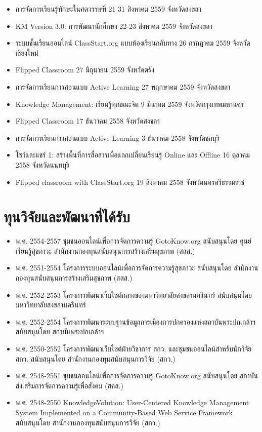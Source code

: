 \begin{tcolorbox}[breakable,enhanced,fonttitle=\bfseries]
\begin{itemize}
	\item การจัดการเรียนรู้ทักษะในศตวรรษที่ 21 31 สิงหาคม 2559 จังหวัดสงขลา
	\item KM Version 3.0: การพัฒนานักศึกษา 22-23 สิงหาคม 2559  จังหวัดสงขลา
	\item ระบบชั้นเรียนออนไลน์ ClassStart.org แบบห้องเรียนกลับทาง 26 กรกฎาคม 2559  จังหวัดเชียงใหม่
	\item Flipped Classroom 27 มิถุนายน 2559  จังหวัดตรัง
	\item การจัดการเรียนการสอนแบบ Active Learning 27 พฤกษาคม 2559 จังหวัดสงขลา
	\item Knowledge Management: เรียนรู้ทุกขณะจิต 9 มีนาคม 2559  จังหวัดกรุงเทพมหานคร
	\item Flipped Classroom 17 ธันวาคม 2558 จังหวัดสงขลา
	\item การจัดการเรียนการสอนแบบ Active Learning 3 ธันวาคม 2558  จังหวัดชลบุรี
	\item โชว์และแชร์ 1: สร้างพื้นที่การสื่อสารเพื่อแลกเปลี่ยนเรียนรู้ Online และ Offline  16 ตุลาคม 2558 จังหวัดนนทบุรี
	\item Flipped classroom with ClassStart.org 19 สิงหาคม 2558  จังหวัดนครศรีธรรมราช
\end{itemize}
\end{tcolorbox}
\vspace{1.5cm}

\section*{ทุนวิจัยและพัฒนาที่ได้รับ}

\begin{tcolorbox}[breakable,enhanced,fonttitle=\bfseries]
\begin{itemize}
	\item พ.ศ. 2554-2557 ชุมชนออนไลน์เพื่อการจัดการความรู้ GotoKnow.org สนับสนุนโดย ศูนย์เรียนรู้สุขภาวะ สำนักงานกองทุนสนับสนุนการสร้างเสริมสุขภาพ (สสส.)
	\item พ.ศ. 2551-2554 โครงการระบบออนไลน์เพื่อการจัดการความรู้สุขภาวะ สนับสนุนโดย สำนักงานกองทุนสนับสนุนการสร้างเสริมสุขภาพ (สสส.)
	\item พ.ศ. 2552-2553 โครงการพัฒนาเว็บไซต์กลางของมหาวิทยาลัยสงขลานครินทร์ สนับสนุนโดย มหาวิทยาลัยสงขลานครินทร์
	\item พ.ศ. 2552-2554 โครงการพัฒนาระบบฐานข้อมูลการเมืองการปกครองแห่งสถาบันพระปกเกล้าฯ สนับสนุนโดย สถาบันพระปกเกล้าฯ
	\item พ.ศ. 2550-2552 โครงการพัฒนาเว็บไซต์ฝ่ายวิชาการ สกว. และชุมชนออนไลน์สำหรับนักวิจัย สกว. สนับสนุนโดย สำนักงานกองทุนสนับสนุนการวิจัย (สกว.)
	\item พ.ศ. 2548-2551 ชุมชนออนไลน์เพื่อการจัดการความรู้ GotoKnow.org สนับสนุนโดย สถาบันส่งเสริมการจัดการความรู้เพื่อสังคม (สคส.)
	\item พ.ศ. 2548-2550 KnowledgeVolution: User-Centered Knowledge Management System Implemented on a Community-Based Web Service Framework สนับสนุนโดย สำนักงานกองทุนสนับสนุนการวิจัย (สกว.)
\end{itemize}
\end{tcolorbox}
\vspace{1.5cm}

